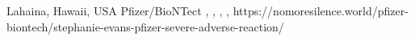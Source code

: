           {
            Lahaina, Hawaii, USA
          }
          {
          }
          {
            Pfizer/BioNTect
          }
          {
          }
          {
            ,
            ,
            ,
            ,
          }
          {
            https://nomoresilence.world/pfizer-biontech/stephanie-evans-pfizer-severe-adverse-reaction/
          }

